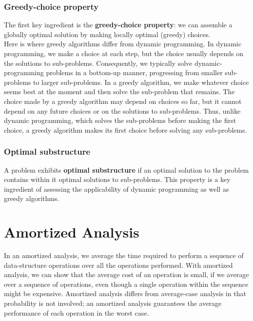 \documentclass[12pt]{article}
\begin{document}
\subsubsection*{Greedy-choice property}

The first key ingredient is the \textbf{greedy-choice property}: we can assemble a globally optimal solution by making locally optimal (greedy) choices. \\

Here is where greedy algorithms differ from dynamic programming. In dynamic programming, we make a choice at each step, but the choice usually depends on the solutions to sub-problems. Consequently, we typically solve dynamic-programming problems in a bottom-up manner, progressing from smaller sub-problems to larger sub-problems. In a greedy algorithm, we make whatever choice seems best at the moment and then solve the sub-problem that remains. The choice made by a greedy algorithm may depend on choices so far, but it cannot depend on any future choices or on the solutions to sub-problems. Thus, unlike dynamic programming, which solves the sub-problems before making the first choice, a greedy algorithm makes its first choice before solving any sub-problems.

\subsubsection*{Optimal substructure}

A problem exhibits \textbf{optimal substructure} if an optimal solution to the problem contains within it optimal solutions to sub-problems. This property is a key ingredient of assessing the applicability of dynamic programming as well as greedy algorithms.

\section{Amortized Analysis}

In an amortized analysis, we average the time required to perform a sequence of data-structure operations over all the operations performed. With amortized analysis, we can show that the average cost of an operation is small, if we average over a sequence of operations, even though a single operation within the sequence might be expensive. Amortized analysis differs from average-case analysis in that probability is not involved; an amortized analysis guarantees the average performance of each operation in the worst case.
\end{document}
